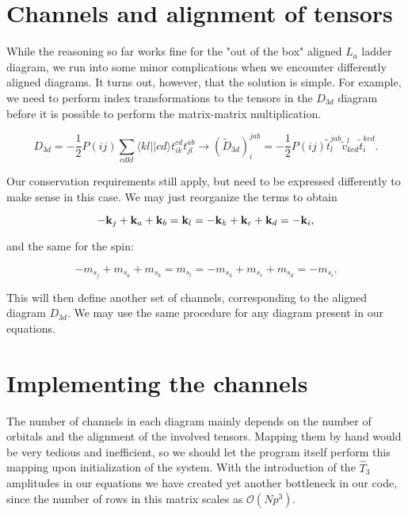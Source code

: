 \section{Channels and alignment of tensors}

While the reasoning so far works fine for the "out of the box" aligned $L_a$ ladder diagram, we run into some minor complications when we encounter differently aligned diagrams. It turns out, however, that the solution is simple. For example, we need to perform index transformations to the tensors in  the $D_{3d}$ diagram before it is possible to perform the matrix-matrix multiplication. 

\begin{equation}
D_{3d}= -\frac{1}{2} P(ij) \sum_{cdkl} \langle kl \vert \vert cd \rangle t_{ik}^{cd} t_{jl}^{ab} \rightarrow (\tilde{D}_{3d})^{jab}_{i} =  -\frac{1}{2} P(ij) \tilde{t}^{jab}_l \tilde{v}_{kcd}^{l}  \tilde{t}^{kcd}_i.
\end{equation}

Our conservation requirements still apply, but need to be expressed differently to make sense in this case. We may just reorganize the terms to obtain

\begin{equation}
- \bold{k}_j + \bold{k}_a + \bold{k}_b = \bold{k}_l = -\bold{k}_k + \bold{k}_c + \bold{k}_d = -\bold{k}_i,
\end{equation}

and the same for the spin:

\begin{equation}
- m_{s_j} + m_{s_a} + m_{s_b} = m_{s_l} = -m_{s_k} + m_{s_c} + m_{s_d} = -m_{s_i}.
\end{equation}

This will then define another set of channels, corresponding to the aligned diagram $D_{3d}$. We may use the same procedure for any diagram present in our equations.

\section{Implementing the channels}

The number of channels in each diagram mainly depends on the number of orbitals and the alignment of the involved tensors. Mapping them by hand would be very tedious and inefficient, so we should let the program itself perform this mapping upon initialization of the system. With the introduction of the $\hat{T}_3$ amplitudes in our equations we have created yet another bottleneck in our code, since the number of rows in this matrix scales as $\mathcal{O}(Np^3)$.

